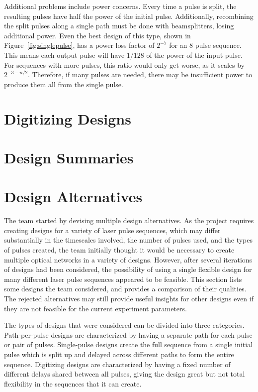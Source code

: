 \documentclass[pdftex,12pt,a4paper]{article}
\begin{document}
Additional problems include power concerns. Every time a pulse is split, the resulting pulses have half the power of the initial pulse. Additionally, recombining the split pulses along a single path must be done with beamsplitters, losing additional power. Even the best design of this type, shown in Figure~\ref{fig:singlepulse}, has a power loss factor of $2^{-7}$ for an 8 pulse sequence. This means each output pulse will have $1/128$ of the power of the input pulse. For sequences with more pulses, this ratio would only get worse, as it scales by $2^{-3-n/2}$. Therefore, if many pulses are needed, there may be insufficient power to produce them all from the single pulse.






\section{Digitizing Designs}
\label{sec:digitizing_designs}

\section{Design Summaries}
\label{sec:design_summary}

\section{Design Alternatives}
\label{sec:design_alternatives}
The team started by devising multiple design alternatives. As the project requires creating designs for a variety of laser pulse sequences, which may differ substantially in the timescales involved, the number of pulses used, and the types of pulses created, the team initially thought it would be necessary to create multiple optical networks in a variety of designs. However, after several iterations of designs had been considered, the possibility of using a single flexible design for many different laser pulse sequences appeared to be feasible. This section lists some designs the team considered, and provides a comparison of their qualities. The rejected alternatives may still provide useful insights for other designs even if they are not feasible for the current experiment parameters.

	The types of designs that were considered can be divided into three categories.  Path-per-pulse designs are characterized by having a separate path for each pulse or pair of pulses. Single-pulse designs create the full sequence from a single initial pulse which is split up and delayed across different paths to form the entire sequence. Digitizing designs are characterized by having a fixed number of different delays shared between all pulses, giving the design great but not total flexibility in the sequences that it can create.
    
\end{document}
